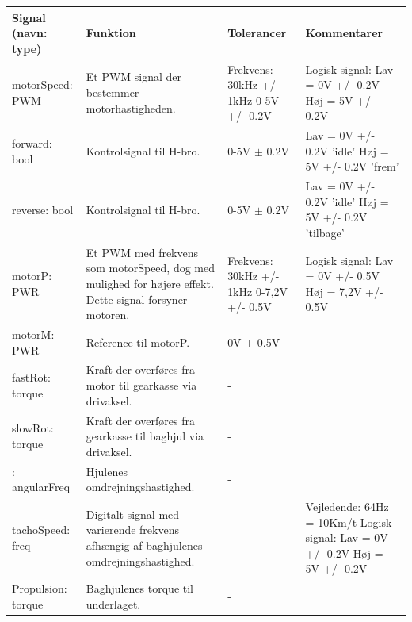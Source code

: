 \begin{table}[h]
	\centering
	\begin{tabularx}{\textwidth}{|l|X|X|X|} \hline
	\textbf{Signal (navn: type)} & \textbf{Funktion} & \textbf{Tolerancer} & \textbf{Kommentarer} \\ \hline
motorSpeed: PWM
	& Et PWM signal der bestemmer motorhastigheden. 
	& Frekvens: 30kHz +/- 1kHz 0-5V +/- 0.2V
 	& Logisk signal: \newline
		Lav = 0V +/- 0.2V \newline
		Høj = 5V +/- 0.2V
	\\ \hline

forward: bool
	& Kontrolsignal til H-bro.
	& 0-5V $\pm$ 0.2V
	& Lav = 0V +/- 0.2V  ’idle’ \newline
		Høj =  5V +/- 0.2V  ’frem’
	\\ \hline
	
reverse: bool
	& Kontrolsignal til H-bro.
	& 0-5V $\pm$ 0.2V
	& Lav = 0V +/- 0.2V ’idle’ \newline
		Høj =  5V +/- 0.2V  ’tilbage’
	\\ \hline
	
motorP: PWR
	& Et PWM med frekvens som motorSpeed, dog med mulighed for højere effekt. 			Dette signal forsyner motoren.
	& Frekvens: 30kHz +/- 1kHz 0-7,2V +/- 0.5V

 	& Logisk signal: \newline
		Lav = 0V +/- 0.5V \newline 
		Høj = 7,2V +/- 0.5V
	\\ \hline

motorM: PWR
	& Reference til motorP.
	& 0V $\pm$ 0.5V
	& ~
	\\ \hline
	
fastRot: torque
	& Kraft der overføres fra motor til gearkasse via drivaksel.
	& - 
	& ~
	\\ \hline
	
slowRot: torque
	& Kraft der overføres fra gearkasse til baghjul via drivaksel.
	& - 
	& ~
	\\ \hline
	
: angularFreq
	& Hjulenes omdrejningshastighed.
	& - 
	& ~
	\\ \hline
	
tachoSpeed: freq
	& Digitalt signal med varierende frekvens afhængig af baghjulenes 					omdrejningshastighed.
	& - 
	& Vejledende: \newline
		64Hz = 10Km/t \newline
		Logisk signal: \newline
		Lav = 0V +/- 0.2V \newline
		Høj = 5V +/- 0.2V

	\\ \hline
	
Propulsion: torque
	& Baghjulenes torque til underlaget.
	& - 
	& ~
	\\ \hline
	\end{tabularx}
\end{table}